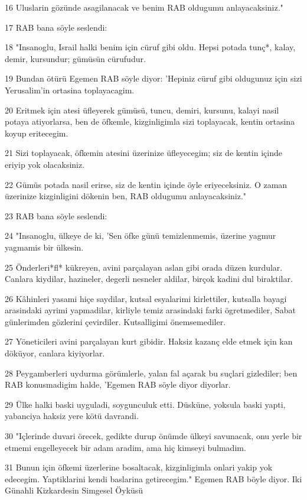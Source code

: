 \par 16 Uluslarin gözünde asagilanacak ve benim RAB oldugumu anlayacaksiniz."
\par 17 RAB bana söyle seslendi:
\par 18 "Insanoglu, Israil halki benim için cüruf gibi oldu. Hepsi potada tunç*, kalay, demir, kursundur; gümüsün cürufudur.
\par 19 Bundan ötürü Egemen RAB söyle diyor: 'Hepiniz cüruf gibi oldugunuz için sizi Yerusalim'in ortasina toplayacagim.
\par 20 Eritmek için atesi üfleyerek gümüsü, tuncu, demiri, kursunu, kalayi nasil potaya atiyorlarsa, ben de öfkemle, kizginligimla sizi toplayacak, kentin ortasina koyup eritecegim.
\par 21 Sizi toplayacak, öfkemin atesini üzerinize üfleyecegim; siz de kentin içinde eriyip yok olacaksiniz.
\par 22 Gümüs potada nasil erirse, siz de kentin içinde öyle eriyeceksiniz. O zaman üzerinize kizginligini dökenin ben, RAB oldugumu anlayacaksiniz."
\par 23 RAB bana söyle seslendi:
\par 24 "Insanoglu, ülkeye de ki, 'Sen öfke günü temizlenmemis, üzerine yagmur yagmamis bir ülkesin.
\par 25 Önderleri*fl* kükreyen, avini parçalayan aslan gibi orada düzen kurdular. Canlara kiydilar, hazineler, degerli nesneler aldilar, birçok kadini dul biraktilar.
\par 26 Kâhinleri yasami hiçe saydilar, kutsal esyalarimi kirlettiler, kutsalla bayagi arasindaki ayrimi yapmadilar, kirliyle temiz arasindaki farki ögretmediler, Sabat günlerimden gözlerini çevirdiler. Kutsalligimi önemsemediler.
\par 27 Yöneticileri avini parçalayan kurt gibidir. Haksiz kazanç elde etmek için kan döküyor, canlara kiyiyorlar.
\par 28 Peygamberleri uydurma görümlerle, yalan fal açarak bu suçlari gizlediler; ben RAB konusmadigim halde, 'Egemen RAB söyle diyor diyorlar.
\par 29 Ülke halki baski uyguladi, soygunculuk etti. Düsküne, yoksula baski yapti, yabanciya haksiz yere kötü davrandi.
\par 30 "Içlerinde duvari örecek, gedikte durup önümde ülkeyi savunacak, onu yerle bir etmemi engelleyecek bir adam aradim, ama hiç kimseyi bulmadim.
\par 31 Bunun için öfkemi üzerlerine bosaltacak, kizginligimla onlari yakip yok edecegim. Yaptiklarini kendi baslarina getirecegim." Egemen RAB böyle diyor. Iki Günahli Kizkardesin Simgesel Öyküsü

